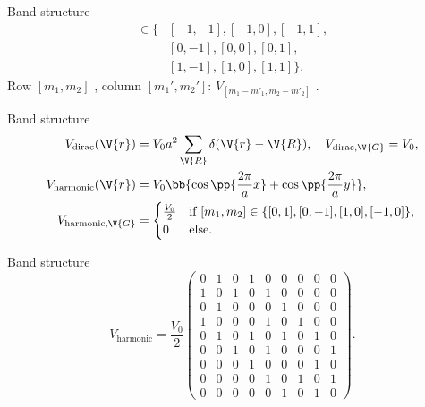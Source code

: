 \documentclass{beamer}
\newcommand{\coef}[1]{_{[#1]}}
\begin{document}
\begin{frame}{Band structure}
\begin{align*}
[m_1, m_2] \in \{ &[-1, -1], [-1, 0], [-1, 1],\\ &[0, -1], [0, 0], [0, 1],\\ &[1,-1], [1, 0], [1,1]  \}.
\end{align*}
Row $ [m_1, m_2] $ , column $ [m_1', m_2'] $: $ V\coef{m_1-m'_1, m_2-m'_2} $ .
\end{frame}


\begin{frame}{Band structure}
\begin{align*}\label{key}
	V_{\text{dirac}}(\V{r}) &= V_0 a^2 \sum_{\V{R}} \delta(\V{r}-\V{R}), \quad V_{\text{dirac},\V{G}} = V_0, \\
	V_{\text{harmonic}}(\V{r}) &= V_0 \bb{\cos\pp{\frac{2\pi}{a} x} + \cos\pp{\frac{2\pi}{a} y}},\\
	V_{\text{harmonic}, \V{G}} &= \begin{cases}
	\frac{V_0}{2} 	& \text{if } [m_1, m_2] \in \{[0,1], [0,-1], [1,0], [-1,0]\}, \\
	0					& \text{else}.
	\end{cases}
\end{align*}
\end{frame}


\begin{frame}{Band structure}
\begin{equation*}
V_{\text{harmonic}} = \frac{V_0}{2} \begin{pmatrix}
0 & 1 & 0 & 1 & 0 & 0 & 0 & 0 & 0 \\
1 & 0 & 1 & 0 & 1 & 0 & 0 & 0 & 0 \\
0 & 1 & 0 & 0 & 0 & 1 & 0 & 0 & 0 \\
1 & 0 & 0 & 0 & 1 & 0 & 1 & 0 & 0 \\
0 & 1 & 0 & 1 & 0 & 1 & 0 & 1 & 0 \\
0 & 0 & 1 & 0 & 1 & 0 & 0 & 0 & 1 \\
0 & 0 & 0 & 1 & 0 & 0 & 0 & 1 & 0 \\
0 & 0 & 0 & 0 & 1 & 0 & 1 & 0 & 1 \\
0 & 0 & 0 & 0 & 0 & 1 & 0 & 1 & 0
\end{pmatrix}.
\end{equation*}
\end{frame}
\end{document}
